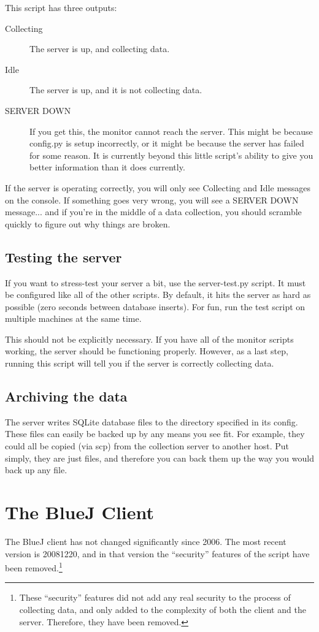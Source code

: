 \documentclass[12pt]{article}
\begin{document}
This script has three outputs:
\begin{description}
	\item[Collecting] The server is up, and collecting data.
	\item[Idle] The server is up, and it is {\strong not} collecting data.
	\item[SERVER DOWN] If you get this, the monitor cannot reach the server. This might be because {\code config.py} is setup incorrectly, or it might be because the server has failed for some reason. It is currently beyond this little script's ability to give you better information than it does currently.
\end{description}

If the server is operating correctly, you will only see {\code Collecting} and {\code Idle} messages on the console. If something goes very wrong, you will see a {\code SERVER DOWN} message... and if you're in the middle of a data collection, you should scramble quickly to figure out why things are broken.

\subsection{Testing the server}
If you want to stress-test your server a bit, use the {\code server-test.py} script. It must be configured like all of the other scripts. By default, it hits the server as hard as possible (zero seconds between database inserts). For fun, run the test script on multiple machines at the same time. 

This should not be explicitly necessary. If you have all of the monitor scripts working, the server should be functioning properly. However, as a last step, running this script will tell you if the server is correctly collecting data.

\subsection{Archiving the data}
The server writes SQLite database files to the directory specified in its config. These files can easily be backed up by any means you see fit. For example, they could all be copied (via {\code scp}) from the collection server to another host. Put simply, they are {\strong just files}, and therefore you can back them up the way you would back up any file. 

\section{The BlueJ Client}
The BlueJ client has not changed significantly since 2006. The most recent version is 20081220, and in that version the ``security'' features of the script have been removed.\footnote{These ``security'' features did not add any real security to the process of collecting data, and only added to the complexity of both the client and the server. Therefore, they have been removed.}
\end{document}
